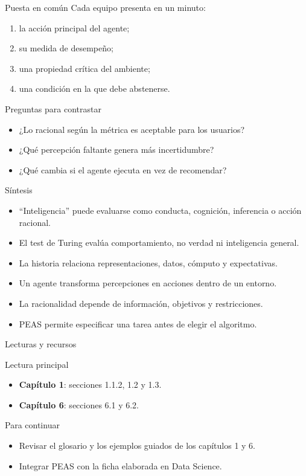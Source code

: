 \documentclass[aspectratio=169,11pt]{beamer}
\begin{document}
\begin{frame}{Puesta en común}
  Cada equipo presenta en un minuto:
  \begin{enumerate}
    \item la acción principal del agente;
    \item su medida de desempeño;
    \item una propiedad crítica del ambiente;
    \item una condición en la que debe abstenerse.
  \end{enumerate}
  \begin{block}{Preguntas para contrastar}
    \begin{itemize}
      \item ¿Lo racional según la métrica es aceptable para los usuarios?
      \item ¿Qué percepción faltante genera más incertidumbre?
      \item ¿Qué cambia si el agente ejecuta en vez de recomendar?
    \end{itemize}
  \end{block}
\end{frame}

\begin{frame}{Síntesis}
  \begin{itemize}
    \item ``Inteligencia'' puede evaluarse como conducta, cognición, inferencia o acción racional.
    \item El test de Turing evalúa comportamiento, no verdad ni inteligencia general.
    \item La historia relaciona representaciones, datos, cómputo y expectativas.
    \item Un agente transforma percepciones en acciones dentro de un entorno.
    \item La racionalidad depende de información, objetivos y restricciones.
    \item PEAS permite especificar una tarea antes de elegir el algoritmo.
  \end{itemize}
\end{frame}

\begin{frame}{Lecturas y recursos}
  \begin{block}{Lectura principal}
    \begin{itemize}
      \item \textbf{Capítulo 1}: secciones 1.1.2, 1.2 y 1.3.
      \item \textbf{Capítulo 6}: secciones 6.1 y 6.2.
    \end{itemize}
  \end{block}
  \begin{block}{Para continuar}
    \begin{itemize}
      \item Revisar el glosario y los ejemplos guiados de los capítulos 1 y 6.
      \item Integrar PEAS con la ficha elaborada en Data Science.
    \end{itemize}
  \end{block}
\end{frame}
\end{document}
